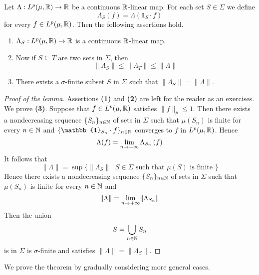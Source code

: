 \begin{lemma}\label{lemma:restriction_of_functionals_lemma}
  Let $\Lambda:L^p(\mu,{\mathbb R})\rightarrow {\mathbb R}$ be a continuous ${\mathbb R}$-linear map. For each set $S \in \Sigma$ we define
  $$\Lambda_S(f) = \Lambda\left(\mathbb{1}_S\cdot f\right)$$
  for every $f \in L^p(\mu,{\mathbb R})$. Then the following assertions hold.
  \begin{enumerate}[label=\emph{\textbf{(\arabic*)}}, leftmargin=*]
    \item $\Lambda_S:L^p(\mu,{\mathbb R})\rightarrow {\mathbb R}$ is a continuous ${\mathbb R}$-linear map.
    \item Now if $S\subseteq T$ are two sets in $\Sigma$, then
          $$\lVert \Lambda_S\rVert \leq \lVert \Lambda_T\rVert \leq \lVert \Lambda \rVert$$
    \item There exists a $\sigma$-finite subset $S$ in $\Sigma$ such that $\lVert \Lambda_S\rVert = \lVert \Lambda \rVert$.
  \end{enumerate}
\end{lemma}
\begin{proof}[Proof of the lemma]
  Assertions \textbf{(1)} and \textbf{(2)} are left for the reader as an exercises.\\
  We prove \textbf{(3)}. Suppose that $f \in L^p(\mu, {\mathbb R})$ satisfies $\lVert f \rVert_p \leq 1$. Then there exists a nondecreasing sequence $\{S_n\}_{n\in {\mathbb N}}$ of sets in $\Sigma$ such that $\mu(S_n)$ is finite for every $n\in {\mathbb N}$ and $\{\mathbb{1}_{S_n}\cdot f\}_{n\in \NN}$ converges to $f$ in $L^p(\mu, {\mathbb R})$. Hence
  $$\Lambda(f) = \lim_{n\rightarrow +\infty}\Lambda_{S_n}\left(f\right)$$
  It follows that
  $$\lVert \Lambda \rVert = \sup \big\{\lVert \Lambda_S \rVert\,\big|\,S\in \Sigma\mbox{ such that }\mu(S)\mbox{ is finite }\}$$
  Hence there exists a nondecreasing sequence $\{S_n\}_{n\in {\mathbb N}}$ of sets in $\Sigma$ such that $\mu(S_n)$ is finite for every $n\in {\mathbb N}$ and
  $$\lVert \Lambda \rVert = \lim_{n\rightarrow +\infty}\lVert \Lambda_{S_n} \rVert$$
  Then the union
  $$S = \bigcup_{n \in {\mathbb N}}S_n$$
  is in $\Sigma$ is $\sigma$-finite and satisfies $\lVert \Lambda \rVert = \lVert \Lambda_S\rVert$.
\end{proof}
\noindent
We prove the theorem by gradually considering more general cases.

